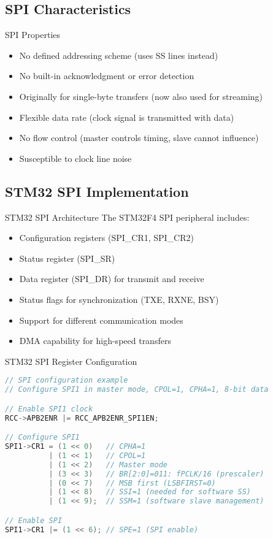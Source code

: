 \subsection{SPI Characteristics}

\begin{definition}{SPI Properties}
\begin{itemize}
    \item No defined addressing scheme (uses SS lines instead)
    \item No built-in acknowledgment or error detection
    \item Originally for single-byte transfers (now also used for streaming)
    \item Flexible data rate (clock signal is transmitted with data)
    \item No flow control (master controls timing, slave cannot influence)
    \item Susceptible to clock line noise
\end{itemize}
\end{definition}

\subsection{STM32 SPI Implementation}

\begin{concept}{STM32 SPI Architecture}
The STM32F4 SPI peripheral includes:
\begin{itemize}
    \item Configuration registers (SPI\_CR1, SPI\_CR2)
    \item Status register (SPI\_SR)
    \item Data register (SPI\_DR) for transmit and receive
    \item Status flags for synchronization (TXE, RXNE, BSY)
    \item Support for different communication modes
    \item DMA capability for high-speed transfers
\end{itemize}
\end{concept}

\begin{code}{STM32 SPI Register Configuration}
\begin{lstlisting}[language=C, style=basesmol]
// SPI configuration example
// Configure SPI1 in master mode, CPOL=1, CPHA=1, 8-bit data

// Enable SPI1 clock
RCC->APB2ENR |= RCC_APB2ENR_SPI1EN;

// Configure SPI1
SPI1->CR1 = (1 << 0)   // CPHA=1
          | (1 << 1)   // CPOL=1
          | (1 << 2)   // Master mode
          | (3 << 3)   // BR[2:0]=011: fPCLK/16 (prescaler)
          | (0 << 7)   // MSB first (LSBFIRST=0)
          | (1 << 8)   // SSI=1 (needed for software SS)
          | (1 << 9);  // SSM=1 (software slave management)

// Enable SPI
SPI1->CR1 |= (1 << 6); // SPE=1 (SPI enable)
\end{lstlisting}
\end{code}

